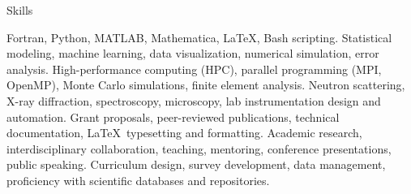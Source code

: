 
\begin{rubric}{Skills}

    Fortran, Python, MATLAB, Mathematica, \LaTeX, Bash scripting.
    Statistical modeling, machine learning, data visualization, numerical simulation, error analysis.
    High-performance computing (HPC), parallel programming (MPI, OpenMP), Monte Carlo simulations, finite element analysis.
    Neutron scattering, X-ray diffraction, spectroscopy, microscopy, lab instrumentation design and automation.
    Grant proposals, peer-reviewed publications, technical documentation, \LaTeX\ typesetting and formatting.
    Academic research, interdisciplinary collaboration, teaching, mentoring, conference presentations, public speaking.
    Curriculum design, survey development, data management, proficiency with scientific databases and repositories.
\end{rubric}
